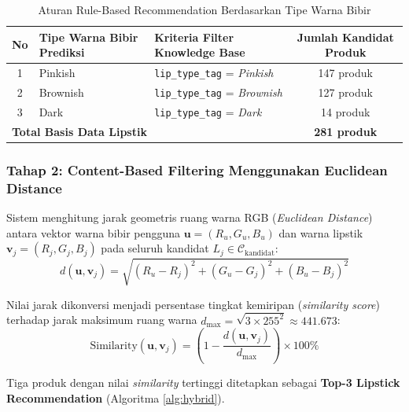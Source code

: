 \documentclass[10pt,a4paper]{article}
\begin{document}
\begin{table}[htbp]
  \centering
  \caption{Aturan Rule-Based Recommendation Berdasarkan Tipe Warna Bibir}
  \label{tab:rule_based}
  \fontsize{8.5pt}{11pt}\selectfont
  \begin{tabular}{cllc}
    \toprule
    \textbf{No} & \textbf{Tipe Warna Bibir Prediksi} & \textbf{Kriteria Filter Knowledge Base} & \textbf{Jumlah Kandidat Produk} \\
    \midrule
    1 & Pinkish  & \texttt{lip\_type\_tag} = \textit{Pinkish}  & 147 produk \\
    2 & Brownish & \texttt{lip\_type\_tag} = \textit{Brownish} & 127 produk \\
    3 & Dark     & \texttt{lip\_type\_tag} = \textit{Dark}     & 14 produk \\
    \midrule
    \multicolumn{3}{l}{\textbf{Total Basis Data Lipstik}} & \textbf{281 produk} \\
    \bottomrule
  \end{tabular}
\end{table}

\subsubsection{Tahap 2: Content-Based Filtering Menggunakan Euclidean Distance}
Sistem menghitung jarak geometris ruang warna RGB (\textit{Euclidean Distance}) antara vektor warna bibir pengguna $\mathbf{u} = (R_u, G_u, B_u)$ dan warna lipstik $\mathbf{v}_j = (R_j, G_j, B_j)$ pada seluruh kandidat $L_j \in \mathcal{C}_{\text{kandidat}}$:
\begin{equation}
  d(\mathbf{u}, \mathbf{v}_j) = \sqrt{(R_u - R_j)^2 + (G_u - G_j)^2 + (B_u - B_j)^2}
  \label{eq:euclidean}
\end{equation}

Nilai jarak dikonversi menjadi persentase tingkat kemiripan (\textit{similarity score}) terhadap jarak maksimum ruang warna $d_{\max} = \sqrt{3 \times 255^2} \approx 441.673$:
\begin{equation}
  \text{Similarity}(\mathbf{u}, \mathbf{v}_j) = \left( 1 - \frac{d(\mathbf{u}, \mathbf{v}_j)}{d_{\max}} \right) \times 100\%
  \label{eq:similarity}
\end{equation}

Tiga produk dengan nilai \textit{similarity} tertinggi ditetapkan sebagai \textbf{Top-3 Lipstick Recommendation} (Algoritma \ref{alg:hybrid}).
\end{document}
